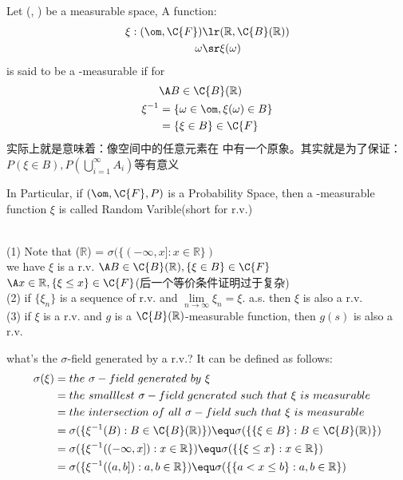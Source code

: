 \newcommand{\rr}{\ensuremath{\mathbb{R}}}

\newpage
{}
\begin{definition}
    Let (\om, ) be a measurable space, A function:
    \begin{align*}
        \xi: (\om, \C{F}) & \lr (\rr, \C{B}(\rr))\\
        \omega & \sr \xi(\omega)
    \end{align*} 
    is said to be a -measurable if for 
    \begin{align*}
        & \A B\in \C{B}(\rr) \\
        \xi^{-1}  & = \{\omega\in\om, \xi(\omega)\in B\}\\
                  & = \{\xi\in B\}\in\C{F} 
    \end{align*} 
    实际上就是意味着：像空间中的任意元素在  中有一个原象。其实就是为了保证：\newline
    $P(\xi\in B), P(\bigcup_{i=1}^\infty A_i) $等有意义
\end{definition}

In Particular, if $(\om, \C{F}, P)$ is a Probability Space, then a 
-measurable function $\xi$ is called Random Varible(short for r.v.)

\remark\\ 
(1) Note that (\rr) = $\sigma(\{(-\infty, x]:x\in \rr\})$ \\
we have $\xi$ is a r.v. \equ $\A B \in \C{B}(\rr), \{\xi \in B\}\in\C{F}$\\
\hspace*{8.2em}\equ $\A x \in \rr, \{\xi\le x\}\in\C{F}$(\mbox{后一个等价条件证明过于复杂})\\
(2) if $\{\xi_n\}$ is a sequence of r.v. and $\lim\limits_{n\to\infty}{\xi_n}=\xi$. a.s. then $\xi$ is also a r.v.\\
(3) if $\xi$ is a r.v.  and $g$ is a $\C{B}(\rr)$-measurable function, then $g(s)$ is also a r.v.


\begin{definition} what's the $\sigma$-field generated by a r.v.? It can be defined as follows:
    \begin{align*}
        \sigma(\xi) & = the\ \sigma-field\ generated\ by\ \xi\\
        & = the\ smalllest\ \sigma-field\ generated\ such\ that\ \xi\ is\ measurable\\
        & = the\ intersection\ of\ all\ \sigma-field\ such\ that\ \xi\ is\ measurable\\
        & = \sigma(\{\xi^{-1}(B):B\in \C{B}(\rr)\}) \equ \sigma(\{\{\xi\in B\}:B\in\C{B}(\rr)\})\\
        & = \sigma(\{\xi^{-1}((-\infty, x]):x\in \rr\}) \equ \sigma(\{\{\xi\le x\}:x\in \rr\})\\
        & = \sigma(\{\xi^{-1}((a, b]): a, b\in \rr\}) \equ \sigma(\{\{a<x\le b\}:a, b\in \rr\})
    \end{align*}
\end{definition}


